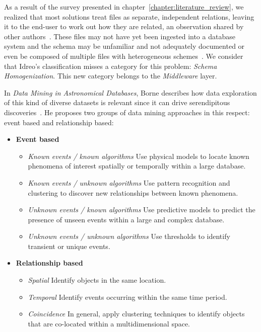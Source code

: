 
As a result of the survey presented in chapter~\ref{chapter:literature_review},
we realized that most solutions treat files
as separate, independent relations, leaving it to the end-user to work out how they are related,
an observation shared by other authors~\cite{Silva2016}.
These files may not have yet been ingested into a database system and 
the schema may be unfamiliar and not adequately documented or even be
composed of multiple files with heterogeneous schemes~\cite{alawini2016,zhang2015astronomy}.
We consider that Idreo's classification misses a category for this problem:
\emph{Schema Homogenization}. This new category belongs to the \emph{Middleware} layer.

In \emph{Data Mining in Astronomical Databases}, Borne
describes how data exploration of this kind of diverse datasets is
relevant since it can drive serendipitous discoveries~\cite{Borne2001}. He proposes
two groups of data mining approaches in this respect: event
based and relationship based:

\begin{itemize}
    \item \textbf{Event based}
        \begin{itemize}
          \item \emph{Known events / known algorithms}
            Use physical models to locate known phenomena of interest spatially
            or temporally within a large database.
          \item \emph{Known events / unknown algorithms}
            Use pattern recognition and clustering to discover new relationships between known
            phenomena.
          \item \emph{Unknown events / known algorithms}
            Use predictive models to predict the presence of unseen events within a
            large and complex database.
          \item \emph{Unknown events / unknown algorithms}
            Use thresholds to identify transient or unique events.
        \end{itemize}

    \item \textbf{Relationship based}
        \begin{itemize}
            \item \emph{Spatial}
                Identify objects in the same location.
            \item \emph{Temporal}
                Identify events occurring within the same time period.
            \item \emph{Coincidence}
                In general, apply clustering techniques to
                identify objects that are co-located within a multidimensional space.
        \end{itemize}
\end{itemize}

